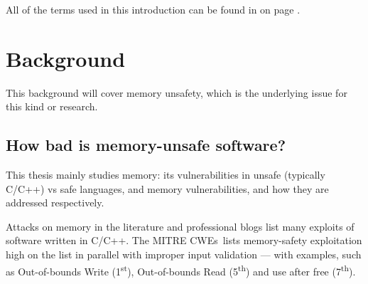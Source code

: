 \documentclass[nomenclature, english, bibtex]{kththesis}
\newcommand*{\generalExpl}[1]{\todo[inline]{#1}}
\begin{document}
All of the terms used in this introduction can be found in  on page \pageref{sec:introductiongloss}.

\section{Background}
\label{sec:background}
This background will cover memory unsafety, which is the underlying issue for this kind or research.


\subsection{How bad is memory-unsafe software?}
\label{sec:sizeOfProblem}



This thesis mainly studies memory: its vulnerabilities in unsafe (typically C/C++) vs safe languages, and memory vulnerabilities, and how they are addressed respectively.  

Attacks on memory in the literature and professional blogs list many exploits of software written in C/C++. The MITRE \glspl{CWE}\,\cite{noauthor_cwe_nodate} lists \gls{memory-safety} exploitation high on the list in parallel with improper input validation --- with examples, such as Out-of-bounds Write (1\textsuperscript{st}), Out-of-bounds Read (5\textsuperscript{th}) and use after free (7\textsuperscript{th}).
\end{document}
